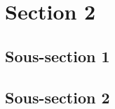\FloatBarrier
\section{Section 2}
\subsection{Sous-section 1}
\blindtext

\subsection{Sous-section 2}
\blindtext
